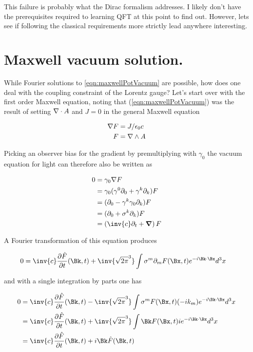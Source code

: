 \documentclass[]{eliblog}
\begin{document}
This failure is probably what the Dirac formalism addresses.  I likely don't have the prerequisites required to learning QFT at this point to find out.  However, lets see if following the classical requirements more strictly lead anywhere interesting.

\section{Maxwell vacuum solution.}

While Fourier solutions to \ref{eqn:maxwellPotVacuum} are possible, how does one deal with the coupling constraint of the Lorentz gauge?  Let's start
over with the first order Maxwell equation, noting that (\ref{eqn:maxwellPotVacuum}) was the result of setting $\nabla \cdot A$ and $J = 0$ in the
general Maxwell equation

\begin{align}\label{eqn:maxwell}
\nabla F &= J/\epsilon_0 c \\
F &= \nabla \wedge A
\end{align}

Picking an observer bias for the gradient by premultiplying with $\gamma_0$ the vacuum equation for light can therefore also be written as

\begin{align*}
0
&= \gamma_0 \grad F \\
&= \gamma_0 (\gamma^0 \partial_0 + \gamma^k \partial_k) F \\
&= (\partial_0 - \gamma^k \gamma_0 \partial_k) F \\
&= (\partial_0 + \sigma^k \partial_k) F \\
&= \left(\inv{c}\partial_t + \spacegrad \right) F \\
\end{align*}

A Fourier transformation of this equation produces

\begin{align*}
0 &= \inv{c} \PD{t}{\hat{F}}(\Bk,t) + \inv{\sqrt{2\pi}^3} \int \sigma^m \partial_m F(\Bx,t) e^{-i \Bk \cdot \Bx} d^3 x
\end{align*}

and with a single integration by parts one has

\begin{align*}
0
&= \inv{c} \PD{t}{\hat{F}}(\Bk,t) - \inv{\sqrt{2\pi}^3} \int \sigma^m F(\Bx,t) (-i k_m) e^{-i \Bk \cdot \Bx} d^3 x \\
&= \inv{c} \PD{t}{\hat{F}}(\Bk,t) + \inv{\sqrt{2\pi}^3} \int \Bk F(\Bx,t) i e^{-i \Bk \cdot \Bx} d^3 x \\
&= \inv{c} \PD{t}{\hat{F}}(\Bk,t) + i \Bk \hat{F}(\Bk,t)
\end{align*}
\end{document}
